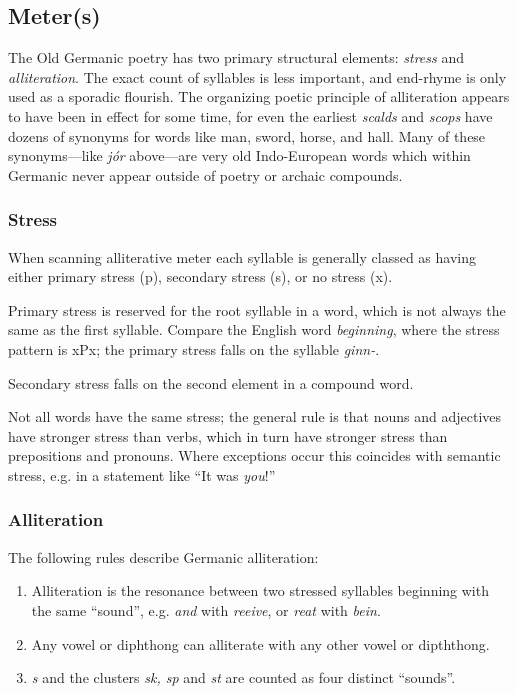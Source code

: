   \subsection{Meter(s)}
    The Old Germanic poetry has two primary structural elements: \emph{stress} and \emph{alliteration}.  The exact count of syllables is less important, and end-rhyme is only used as a sporadic flourish.  The organizing poetic principle of alliteration appears to have been in effect for some time, for even the earliest \emph{scalds} and \emph{scops} have dozens of synonyms for words like man, sword, horse, and hall.  Many of these synonyms—like \emph{jór} above—are very old Indo-European words which within Germanic never appear outside of poetry or archaic compounds.

    \subsubsection{Stress}
    When scanning alliterative meter each syllable is generally classed as having either primary stress (p), secondary stress (s), or no stress (x).

    Primary stress is reserved for the root syllable in a word, which is not always the same as the first syllable.  Compare the English word \emph{beginning}, where the stress pattern is xPx; the primary stress falls on the syllable \emph{ginn-}.

    Secondary stress falls on the second element in a compound word.

    Not all words have the same stress; the general rule is that nouns and adjectives have stronger stress than verbs, which in turn have stronger stress than prepositions and pronouns.  Where exceptions occur this coincides with semantic stress, e.g. in a statement like “It was \emph{you}!”

    \subsubsection{Alliteration}
    The following rules describe Germanic alliteration:

    \begin{enumerate}
      \item Alliteration is the resonance between two stressed syllables beginning with the same “sound”, e.g. \emph{and} with \emph{reeive}, or \emph{reat} with \emph{bein}.
      \item Any vowel or diphthong can alliterate with any other vowel or dipththong.
      \item \emph{s} and the clusters \emph{sk, sp} and \emph{st} are counted as four distinct “sounds”.
    \end{enumerate}

